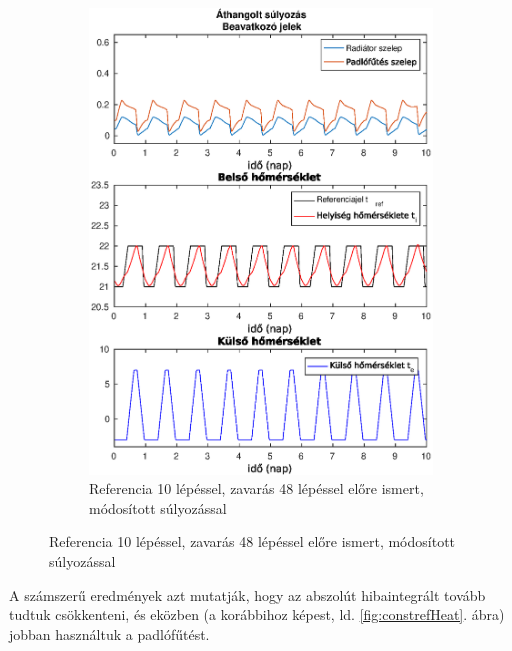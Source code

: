 \begin{figure}[H]
\begin{subfigure}[t]{0.49\textwidth}
		\includegraphics[trim=0 0 0 0, clip,width=\textwidth]{figures/onlab/compare/A_Cdiff_P10D48}
		\caption{Referencia 10 lépéssel, zavarás 48 lépéssel előre ismert, módosított súlyozással}
		\label{fig:mpc-cdiff-p10d48}
	\end{subfigure}
\end{figure}

A számszerű eredmények azt mutatják, hogy az abszolút hibaintegrált tovább tudtuk csökkenteni, és eközben (a korábbihoz képest, ld. \ref{fig:constrefHeat}. ábra) jobban használtuk a padlófűtést.


